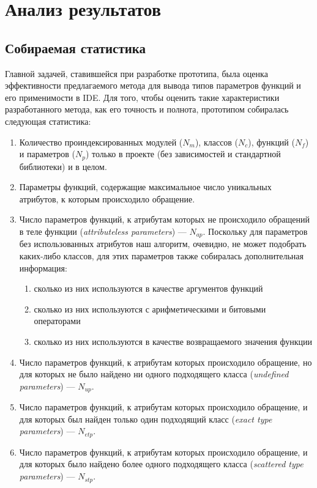 \chapter{Анализ результатов}

\section{Собираемая статистика}
\label{sec:statistics-collecting}

Главной задачей, ставившейся при разработке прототипа, была оценка эффективности
предлагаемого метода для вывода типов параметров функций и его применимости в
IDE. Для того, чтобы оценить такие характеристики разработанного метода, как его
точность и полнота, прототипом собиралась следующая статистика:

\begin{enumerate}
  \item Количество проиндексированных модулей ($N_m$), классов ($N_c$), функций
    ($N_f$) и параметров ($N_p$) только в проекте (без зависимостей и
    стандартной библиотеки) и в целом.

  \item Параметры функций, содержащие максимальное число уникальных атрибутов, к
    которым происходило обращение.

  \item Число параметров функций, к атрибутам которых не происходило обращений в
    теле функции (\emph{attributeless parameters}) --- $N_{ap}$.
    Поскольку для параметров без использованных атрибутов наш алгоритм,
    очевидно, не может подобрать каких-либо классов, для этих параметров также
    собиралась дополнительная информация:
    
    \begin{enumerate}
        \item сколько из них используются в качестве аргументов функций
        \item сколько из них используются с арифметическими и битовыми операторами
        \item сколько из них используются в качестве возвращаемого значения функции
    \end{enumerate}

  \item Число параметров функций, к атрибутам которых происходило обращение, но для
    которых не было найдено ни одного подходящего класса (\emph{undefined
      parameters}) --- $N_{up}$.

  \item Число параметров функций, к атрибутам которых происходило обращение, и для
    которых был найден только один подходящий класс (\emph{exact type parameters}) 
    --- $N_{etp}$.

  \item Число параметров функций, к атрибутам которых происходило обращение, и для
    которых было найдено более одного подходящего класса (\emph{scattered type
      parameters}) --- $N_{stp}$.

\end{enumerate}

